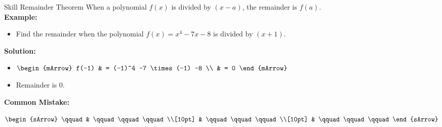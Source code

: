 \clearpage\noindent%
\begin{boxSkill}{Skill \thenskill \quad Remainder Theorem}
    \noindent%
    When a polynomial $f(x)$ is divided by $(x-a)$, the remainder is $f(a)$.\\[1cm]
	\textbf{Example:}
	\begin{itemize}[leftmargin=0.8cm]
	     \item[] Find the remainder when the polynomial $f(x)=x^4 - 7x -8$ is divided by $(x+1)$.	 
	\end{itemize}

	\textbf{Solution:}\\[2mm]
    \begin{itemize}[leftmargin=0.8cm]
	   \item[]  $\begin{mArrow}
                   f(-1) & =  (-1)^4 -7 \times (-1) -8           \\
                      & =  0                                     
	            \end{mArrow}$
	   \item[] Remainder is 0.
	\end{itemize}   
 	 
	
	\tcbline
	
    \textbf{Common Mistake:}\\[0.6cm]
	\begin{warningEnv}
	    $\begin{sArrow}
	        \qquad   & \qquad\qquad\qquad \\[10pt]
	  	             & \qquad\qquad\qquad                                                                        \\[10pt] 
                     & \qquad\qquad\qquad 				   
		 \end{sArrow}$		   
    \end{warningEnv}
\end{boxSkill}




